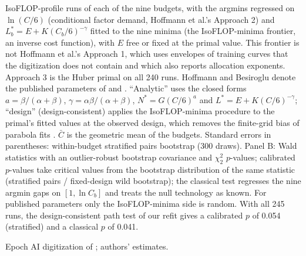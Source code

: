 \begin{table}[tp]
\begin{tablenotes}
IsoFLOP-profile runs of each of the nine budgets, with the argmins regressed on $\ln(C/6)$ (conditional factor demand,
Hoffmann et al.'s Approach 2) and $L^*_b=E+K(C_b/6)^{-\gamma}$ fitted to the nine minima (the IsoFLOP-minima frontier,
an inverse cost function), with $E$ free or fixed at the primal value. This frontier is not Hoffmann et al.'s
Approach 1, which uses envelopes of training curves that the digitization does not contain and which also reports
allocation exponents. Approach 3 is the Huber primal on all 240 runs. Hoffmann and Besiroglu denote the published
parameters of \citet{hoffmann2022training} and \citet{besiroglu2024chinchilla}. ``Analytic'' uses the closed forms
$a=\beta/(\alpha+\beta)$, $\gamma=\alpha\beta/(\alpha+\beta)$, $N^*=G(C/6)^a$ and $L^*=E+K(C/6)^{-\gamma}$; ``design''
(design-consistent) applies the IsoFLOP-minima procedure to the primal's fitted values at the observed design, which
removes the finite-grid bias of parabola fits \citep{czech2026problems}. $\bar C$ is the geometric mean of the budgets.
Standard errors in parentheses: within-budget stratified pairs bootstrap (300 draws). Panel B: Wald statistics with an
outlier-robust bootstrap covariance and $\chi^2_2$ $p$-values; calibrated $p$-values take critical values from the
bootstrap distribution of the same statistic (stratified pairs / fixed-design wild bootstrap); the classical test
regresses the nine argmin gaps on $[1,\ln C_b]$ and treats the null technology as known. For published parameters only
the IsoFLOP-minima side is random. With all 245 runs, the design-consistent path test of our refit gives a calibrated
$p$ of 0.054 (stratified) and a classical $p$ of 0.041.\end{tablenotes}
\begin{tablenotes}[Source]Epoch AI digitization of \citet{hoffmann2022training}; authors' estimates.\end{tablenotes}
\end{table}
